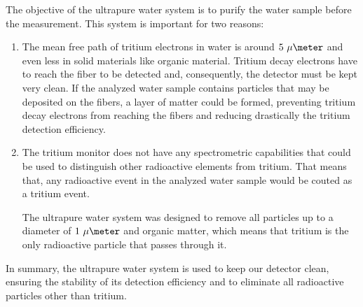 The objective of the ultrapure water system is to purify the water sample before the measurement. This system is important for two reasons:

\begin{enumerate}

\item{} The mean free path of tritium electrons in water is around $5~\mu\meter$ and even less in solid materials like organic material. Tritium decay electrons have to reach the fiber to be detected and, consequently, the detector must be kept very clean. If the analyzed water sample contains particles that may be deposited on the fibers, a layer of matter could be formed, preventing tritium decay electrons from reaching the fibers and reducing drastically the tritium detection efficiency.

\item{} The tritium monitor does not have any spectrometric capabilities that could be used to distinguish other radioactive elements from tritium. That means that, any radioactive event in the analyzed water sample would be couted as a tritium event.

The ultrapure water system was designed to remove all particles up to a diameter of $1~\mu\meter$ and organic matter, which means that tritium is the only radioactive particle that passes through it. 


\end{enumerate}

In summary, the ultrapure water system is used to keep our detector clean, ensuring the stability of its detection efficiency and to eliminate all radioactive particles other than tritium. %